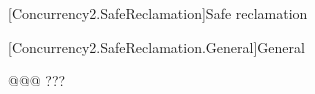 
[Concurrency2.SafeReclamation]{Safe reclamation}

[Concurrency2.SafeReclamation.General]{General}

@@@ ???
